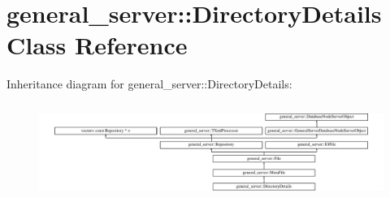 \hypertarget{classgeneral__server_1_1DirectoryDetails}{\section{general\-\_\-server\-:\-:\-Directory\-Details \-Class \-Reference}
\label{classgeneral__server_1_1DirectoryDetails}
}
\-Inheritance diagram for general\-\_\-server\-:\-:\-Directory\-Details\-:\begin{figure}[H]
\begin{center}
\leavevmode
\includegraphics[height=3.146067cm]{classgeneral__server_1_1DirectoryDetails}
\end{center}
\end{figure}
